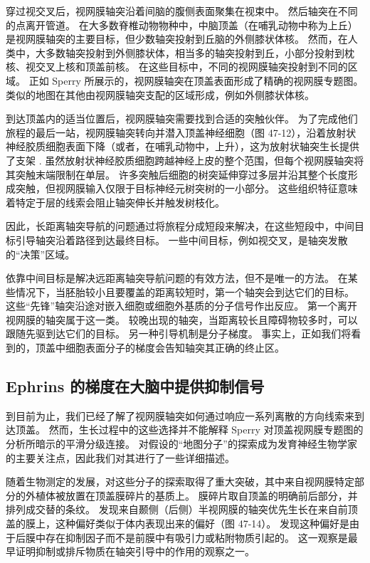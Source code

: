 穿过视交叉后，视网膜轴突沿着间脑的腹侧表面聚集在视束中。 然后轴突在不同的点离开管道。 在大多数脊椎动物物种中，中脑顶盖（在哺乳动物中称为上丘）是视网膜轴突的主要目标，但少数轴突投射到丘脑的外侧膝状体核。 然而，在人类中，大多数轴突投射到外侧膝状体，相当多的轴突投射到丘，小部分投射到枕核、视交叉上核和顶盖前核。 在这些目标中，不同的视网膜轴突投射到不同的区域。 正如 Sperry 所展示的，视网膜轴突在顶盖表面形成了精确的视网膜专题图。 类似的地图在其他由视网膜轴突支配的区域形成，例如外侧膝状体核。

到达顶盖内的适当位置后，视网膜轴突需要找到合适的突触伙伴。 为了完成他们旅程的最后一站，视网膜轴突转向并潜入顶盖神经细胞（图 47-12），沿着放射状神经胶质细胞表面下降（或者，在哺乳动物中，上升），这为放射状轴突生长提供了支架 . 虽然放射状神经胶质细胞跨越神经上皮的整个范围，但每个视网膜轴突将其突触末端限制在单层。 许多突触后细胞的树突延伸穿过多层并沿其整个长度形成突触，但视网膜输入仅限于目标神经元树突树的一小部分。 这些组织特征意味着特定于层的线索会阻止轴突伸长并触发树枝化。

因此，长距离轴突导航的问题通过将旅程分成短段来解决，在这些短段中，中间目标引导轴突沿着路径到达最终目标。 一些中间目标，例如视交叉，是轴突发散的“决策”区域。

依靠中间目标是解决远距离轴突导航问题的有效方法，但不是唯一的方法。 在某些情况下，当胚胎较小且要覆盖的距离较短时，第一个轴突会到达它们的目标。 这些“先锋”轴突沿途对嵌入细胞或细胞外基质的分子信号作出反应。 第一个离开视网膜的轴突属于这一类。 较晚出现的轴突，当距离较长且障碍物较多时，可以跟随先驱到达它们的目标。 另一种引导机制是分子梯度。 事实上，正如我们将看到的，顶盖中细胞表面分子的梯度会告知轴突其正确的终止区。

\subsection{Ephrins 的梯度在大脑中提供抑制信号}
到目前为止，我们已经了解了视网膜轴突如何通过响应一系列离散的方向线索来到达顶盖。 然而，生长过程中的这些选择并不能解释 Sperry 对顶盖视网膜专题图的分析所暗示的平滑分级连接。 对假设的“地图分子”的探索成为发育神经生物学家的主要关注点，因此我们对其进行了一些详细描述。

随着生物测定的发展，对这些分子的探索取得了重大突破，其中来自视网膜特定部分的外植体被放置在顶盖膜碎片的基质上。 膜碎片取自顶盖的明确前后部分，并排列成交替的条纹。 发现来自颞侧（后侧）半视网膜的轴突优先生长在来自前顶盖的膜上，这种偏好类似于体内表现出来的偏好（图 47-14）。 发现这种偏好是由于后膜中存在抑制因子而不是前膜中有吸引力或粘附物质引起的。 这一观察是最早证明抑制或排斥物质在轴突引导中的作用的观察之一。

